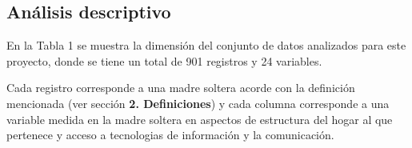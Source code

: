 \documentclass[11pt,twoside]{article}
\begin{document}
\subsection{Análisis descriptivo}
\noindent
En la Tabla 1 se muestra la dimensión del conjunto de datos analizados para este proyecto, donde se tiene un total de 901 registros y 24 variables.
\begin{table}[H]
	\caption{\small{Dimensión de la base de datos.}}
	\label{tabla1}
\end{table}
Cada registro corresponde a una madre soltera acorde con la definición mencionada (ver sección\textbf{ 2. Definiciones}) y cada columna corresponde a una variable medida en la madre soltera en aspectos de estructura del hogar al que pertenece y acceso a tecnologias de información y la comunicación. 
\end{document}
